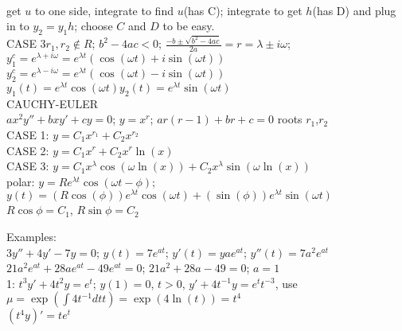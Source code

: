 \documentclass{article}
\begin{document}
\begin{large}
\\get $u$ to one side, integrate to find $u$(has C); integrate to get $h$(has D) and plug in to $y_2=y_1h$; choose $C$ and $D$ to be easy.
\\CASE 3$r_1,r_2\not\in R$; $b^2-4ac<0$; $\frac{-b\pm\sqrt{b^2-4ac}}{2a}=r=\lambda\pm i\omega$; 
\\$y_1^c=e^{\lambda+i\omega}=e^{\lambda t}(\cos(\omega t)+i\sin(\omega  t))$
\\$y_2^c=e^{\lambda-i\omega}=e^{\lambda t}(\cos(\omega t)-i\sin(\omega  t))$
\\$y_1(t)=e^{\lambda t}\cos(\omega t)$\qquad$y_2(t)=e^{\lambda t}\sin(\omega t)$
\\CAUCHY-EULER
\\$ax^2y''+bxy'+cy=0$; $y=x^r$; $ar(r-1)+br+c=0$ roots $r_1$,$r_2$
\\CASE 1: $y=C_1x^{r_1}+C_2x^{r_2}$
\\CASE 2: $y=C_1x^r+C_2x^r\ln(x)$
\\CASE 3: $y=C_1x^{\lambda}\cos(\omega\ln(x))+C_2x^{\lambda}\sin(\omega\ln(x))$
\\polar: $y=Re^{\lambda t}\cos(\omega t-\phi)$; $y(t)=(R\cos(\phi))e^{\lambda t}\cos(\omega t)+(\sin(\phi))e^{\lambda t}\sin(\omega t)$
\\$R\cos\phi=C_1$, $R\sin\phi=C_2$
\end{large}

\noindent
Examples:
\\$3y''+4y'-7y=0$; $y(t)=7e^{at}$; $y'(t)=yae^{at}$; $y''(t)=7a^2e^{at}$
\\$21a^2e^{at}+28ae^{at}-49e^{at}=0$; $21a^2+28a-49=0$; $a=1$
\\1: $t^3y'+4t^2y=e^t$; $y(1)=0$, $t>0$, $y'+4t^{-1}y=e^tt^{-3}$, use $\mu=\exp(\int4t^{-1}dtt)=\exp(4\ln(t))=t^4$
\\$(t^4y)'=te^t$
\end{document}
